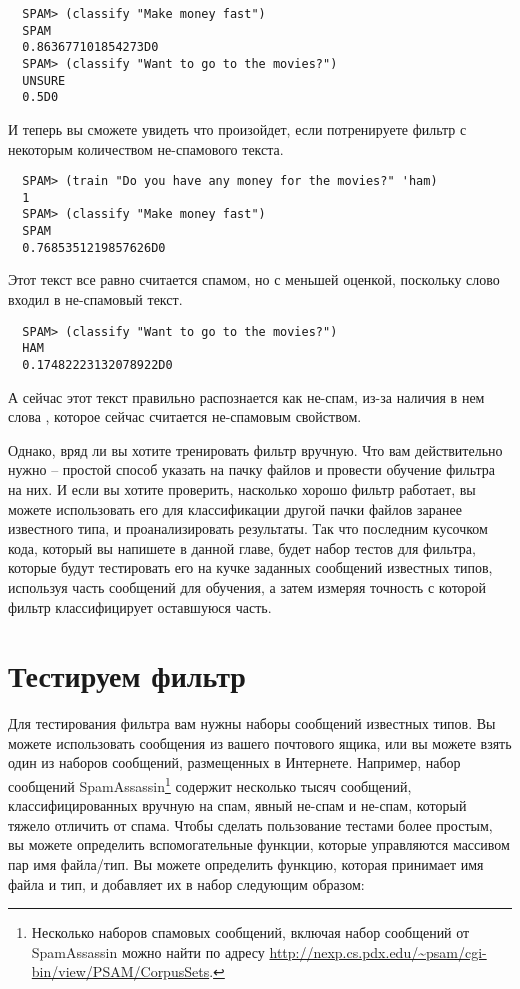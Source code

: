 \begin{verbatim}
  SPAM> (classify "Make money fast")
  SPAM
  0.863677101854273D0
  SPAM> (classify "Want to go to the movies?")
  UNSURE
  0.5D0
\end{verbatim}

И теперь вы сможете увидеть что произойдет, если потренируете фильтр с некоторым
количеством не-спамового текста.

\begin{verbatim}
  SPAM> (train "Do you have any money for the movies?" 'ham)
  1
  SPAM> (classify "Make money fast")
  SPAM
  0.7685351219857626D0
\end{verbatim}

Этот текст все равно считается спамом, но с меньшей оценкой, поскольку слово 
входил в не-спамовый текст.

\begin{verbatim}
  SPAM> (classify "Want to go to the movies?")
  HAM
  0.17482223132078922D0
\end{verbatim}

А сейчас этот текст правильно распознается как не-спам, из-за наличия в нем слова
, которое сейчас считается не-спамовым свойством.

Однако, вряд ли вы хотите тренировать фильтр вручную.  Что вам действительно нужно --
простой способ указать на пачку файлов и провести обучение фильтра на них.  И если вы
хотите проверить, насколько хорошо фильтр работает, вы можете использовать его для
классификации другой пачки файлов заранее известного типа, и проанализировать результаты.
Так что последним кусочком кода, который вы напишете в данной главе, будет набор тестов
для фильтра, которые будут тестировать его на кучке заданных сообщений известных типов,
используя часть сообщений для обучения, а затем измеряя точность с которой фильтр
классифицирует оставшуюся часть.

\section{Тестируем фильтр}

Для тестирования фильтра вам нужны наборы сообщений известных типов.  Вы можете
использовать сообщения из вашего почтового ящика, или вы можете взять один из наборов
сообщений, размещенных в Интернете.  Например, набор сообщений
SpamAssassin\footnote{Несколько наборов спамовых сообщений, включая набор сообщений от
  SpamAssassin можно найти по адресу
  \url{http://nexp.cs.pdx.edu/~psam/cgi-bin/view/PSAM/CorpusSets}.} содержит несколько
тысяч сообщений, классифицированных вручную на спам, явный не-спам и не-спам, который
тяжело отличить от спама.  Чтобы сделать пользование тестами более простым, вы можете
определить вспомогательные функции, которые управляются массивом пар имя файла/тип.  Вы
можете определить функцию, которая принимает имя файла и тип, и добавляет их в набор
следующим образом:

